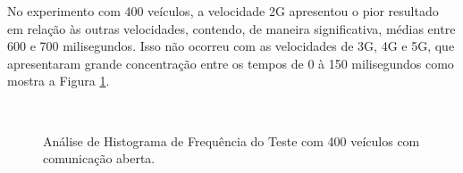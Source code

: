 \documentclass[
	12pt,				%
	oneside,			%
	a4paper,			%
	english,			%
	brazil				%
	]{abntex2ppgsi}
\begin{document}
No experimento com 400 veículos,  a velocidade 2G apresentou o pior resultado em relação às outras velocidades, contendo, de maneira significativa, médias entre 600 e 700 milisegundos. Isso não ocorreu  com as velocidades de 3G, 4G e 5G, que apresentaram grande concentração entre os tempos de 0 à 150 milisegundos como mostra a Figura \ref{fig:imgHistFreq400}.

\begin{figure}[h!]
	\caption{Análise de Histograma de Frequência do Teste  com 400 veículos com comunicação aberta.}
	\centering
	\label{fig:imgHistFreq400}
	\\
\end{figure}
\end{document}
